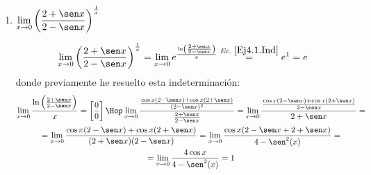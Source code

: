\documentclass[12pt]{article}
\begin{document}
\begin{ejercicio} 
\begin{enumerate}
        Calculo los siguientes límites:
        \begin{equation*}
            \lim_{x\to 0}\frac{\arctan x}{\ln 1+x} \Hop
            \lim_{x\to 0}\frac{1+x}{1+x^2} = 1
        \end{equation*}
        \begin{equation*}
            \lim_{x\to 0}\frac{\arcsen x}{\ln 1+x} \Hop
            \lim_{x\to 0}\frac{1+x}{\sqrt{1-x^2}} = 1
        \end{equation*}
        
        Por tanto, usando los límites calculados, tenemos que:
        \begin{multline*}
            \lim_{x\to 0} \frac{\displaystyle \int_0^x \arcsen(t)\arctan(t)dt}{(\ln (1+x))^3}
            =\\= 
            \lim_{x\to 0} \frac{(1+x)\arcsen x}{6}\lim_{x\to 0} \frac{\arctan x}{\ln(1+x)}
            + \lim_{x\to 0} \frac{(1+x)^2}{6\sqrt{1-x^2}} \lim_{x\to 0} \frac{\arctan x}{\ln(1+x)}
            +\\ + \lim_{x\to 0} \frac{(1+x)^2}{6(1+x^2)}
            \lim_{x\to 0} \frac{\arcsen x }{\ln (1+x)}
            = 0\cdot 1 + \frac{1}{6}\cdot 1 + \frac{1}{6}\cdot 1 = \frac{1}{3}
        \end{multline*}


        

        \item $\displaystyle \lim_{x\to 0} \left(\frac{2+\sen x}{2-\sen x}\right)^{\frac{1}{x}}$

        \begin{equation*}
            \lim_{x\to 0} \left(\frac{2+\sen x}{2-\sen x}\right)^{\frac{1}{x}}
            = \lim_{x\to 0} e^{\frac{\ln\left(\frac{2+\sen x}{2-\sen x}\right)}{x}} \stackrel{Ec.\;\ref{Ej4.1.Ind}}{=} e^1=e
        \end{equation*}
        donde previamente he resuelto esta indeterminación:
        \begin{multline}\label{Ej4.1.Ind}
            \lim_{x\to 0} \frac{\ln\left(\frac{2+\sen x}{2-\sen x}\right)}{x} = \left[\frac{0}{0}\right] \Hop
            \lim_{x\to 0} \frac{\frac{\cos x(2-\sen x)+\cos x(2+\sen x)}{(2-\sen x)^2}}{\frac{2+\sen x}{2-\sen x}}
            = \lim_{x\to 0} \frac{\frac{\cos x(2-\sen x)+\cos x(2+\sen x)}{2-\sen x}}{2+\sen x}
            =\\=
            \lim_{x\to 0} \frac{\cos x(2-\sen x)+\cos x(2+\sen x)}{(2+\sen x)(2-\sen x)}
            =
            \lim_{x\to 0} \frac{\cos x(2-\sen x+2+\sen x)}{4-\sen^2(x)}
            =\\=
            \lim_{x\to 0} \frac{4\cos x}{4-\sen^2(x)} = 1
        \end{multline}
    \end{enumerate}
\end{ejercicio}
\end{document}
